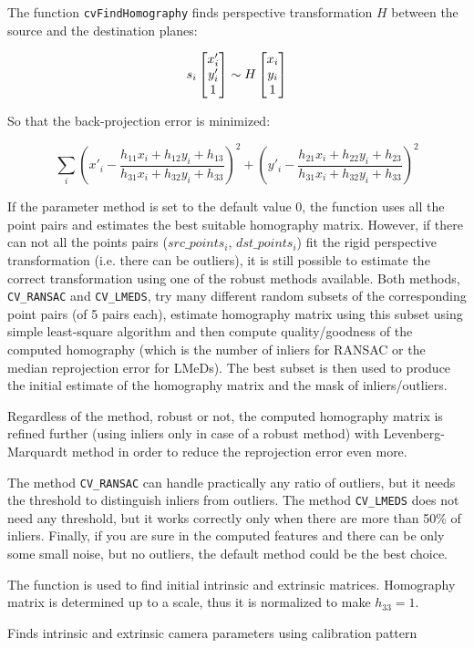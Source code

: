 The function \texttt{cvFindHomography} finds perspective transformation $H$ between the source and the destination planes:

\[
s_i \begin{bmatrix} x'_i\\ y'_i\\ 1 \end{bmatrix} \sim H \begin{bmatrix} x_i\\ y_i\\ 1 \end{bmatrix}
\]

So that the back-projection error is minimized:

\[
\sum_i
\left( x'_i-\frac{h_{11} x_i + h_{12} y_i + h_{13}}{h_{31} x_i + h_{32} y_i + h_{33}} \right)^2+
\left( y'_i-\frac{h_{21} x_i + h_{22} y_i + h_{23}}{h_{31} x_i + h_{32} y_i + h_{33}} \right)^2
\]

If the parameter method is set to the default value 0, the function
uses all the point pairs and estimates the best suitable homography
matrix. However, if there can not all the points pairs ($src\_points_i$,
$dst\_points_i$) fit the rigid perspective transformation (i.e. there
can be outliers), it is still possible to estimate the correct
transformation using one of the robust methods available. Both
methods, \texttt{CV\_RANSAC} and \texttt{CV\_LMEDS}, try many different random subsets
of the corresponding point pairs (of 5 pairs each), estimate
homography matrix using this subset using simple least-square
algorithm and then compute quality/goodness of the computed homography
(which is the number of inliers for RANSAC or the median reprojection
error for LMeDs). The best subset is then used to produce the initial
estimate of the homography matrix and the mask of inliers/outliers.

Regardless of the method, robust or not, the computed homography
matrix is refined further (using inliers only in case of a robust
method) with Levenberg-Marquardt method in order to reduce the
reprojection error even more.

The method \texttt{CV\_RANSAC} can handle practically any ratio of outliers,
but it needs the threshold to distinguish inliers from outliers.
The method \texttt{CV\_LMEDS} does not need any threshold, but it works
correctly only when there are more than 50\% of inliers. Finally,
if you are sure in the computed features and there can be only some
small noise, but no outliers, the default method could be the best
choice.

The function is used to find initial intrinsic and extrinsic matrices.
Homography matrix is determined up to a scale, thus it is normalized
to make $h_{33} =1$.

\label{CalibrateCamera2}

Finds intrinsic and extrinsic camera parameters using calibration pattern

